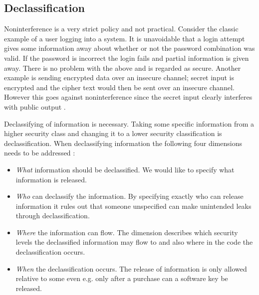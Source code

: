 \subsection{Declassification}
Noninterference is a very strict policy and not practical. Consider the classic example of a user logging into a system. It is unavoidable that a login attempt gives some information away about whether or not the password combination was valid. If the password is incorrect the login fails and partial information is given away. There is no problem with the above and is regarded as secure. Another example is sending encrypted data over an insecure channel; secret input is encrypted and the cipher text would then be sent over an insecure channel. However this goes against noninterference since the secret input clearly interferes with public output \cite{Hedin2011}.

Declassifying of information is necessary. Taking some specific information from a higher security class and changing it to a lower security classification is declassification. When declassifying information the following four dimensions needs to be addressed \cite{Sabelfeld2009}:

\begin{itemize}
	\item \emph{What} information should be declassified. We would like to specify what information is released.
	\item \emph{Who} can declassify the information. By specifying exactly who can release information it rules out that someone unspecified can make unintended leaks through declassification.
	\item \emph{Where} the information can flow. The dimension describes which security levels the declassified information may flow to and also where in the code the declassification occurs. 
	\item \emph{When} the declassification occurs. The release of information is only allowed relative to some even e.g. only after a purchase can a software key be released.
\end{itemize}



